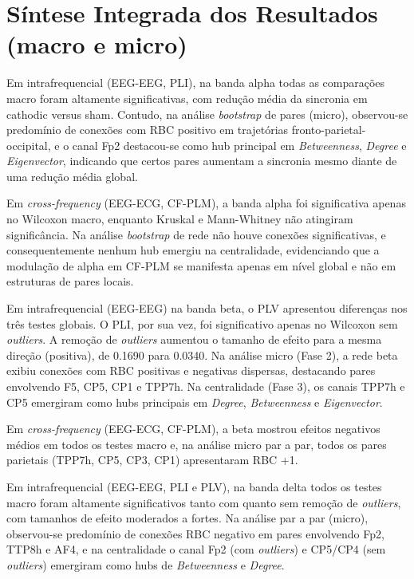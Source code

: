 \section{Síntese Integrada dos Resultados (macro e micro)}
Em intrafrequencial (EEG-EEG, PLI), na banda alpha todas as comparações macro foram altamente significativas, com redução média da sincronia em cathodic versus sham. Contudo, na análise \textit{bootstrap} de pares (micro), observou-se predomínio de conexões com RBC positivo em trajetórias fronto-parietal-occipital, e o canal Fp2 destacou-se como hub principal em \textit{Betweenness}, \textit{Degree} e \textit{Eigenvector}, indicando que certos pares aumentam a sincronia mesmo diante de uma redução média global.

Em \textit{cross-frequency} (EEG-ECG, CF-PLM), a banda alpha foi significativa apenas no Wilcoxon macro, enquanto Kruskal e Mann-Whitney não atingiram significância. Na análise \textit{bootstrap} de rede não houve conexões significativas, e consequentemente nenhum hub emergiu na centralidade, evidenciando que a modulação de alpha em CF-PLM se manifesta apenas em nível global e não em estruturas de pares locais.

Em intrafrequencial (EEG-EEG) na banda beta, o PLV apresentou diferenças nos três testes globais. O PLI, por sua vez, foi significativo apenas no Wilcoxon sem \textit{outliers}. A remoção de \textit{outliers} aumentou o tamanho de efeito para a mesma direção (positiva), de 0.1690 para 0.0340. Na análise micro (Fase 2), a rede beta exibiu conexões com RBC positivas e negativas dispersas, destacando pares envolvendo F5, CP5, CP1 e TPP7h. Na centralidade (Fase 3), os canais TPP7h e CP5 emergiram como hubs principais em \textit{Degree}, \textit{Betweenness} e \textit{Eigenvector}. 

Em \textit{cross-frequency} (EEG-ECG, CF-PLM), a beta mostrou efeitos negativos médios em todos os testes macro e, na análise micro par a par, todos os pares parietais (TPP7h, CP5, CP3, CP1) apresentaram RBC +1.

Em intrafrequencial (EEG-EEG, PLI e PLV), na banda delta todos os testes macro foram altamente significativos tanto com quanto sem remoção de \textit{outliers}, com tamanhos de efeito moderados a fortes. Na análise par a par (micro), observou-se predomínio de conexões RBC negativo em pares envolvendo Fp2, TTP8h e AF4, e na centralidade o canal Fp2 (com \textit{outliers}) e CP5/CP4 (sem \textit{outliers}) emergiram como hubs de \textit{Betweenness} e \textit{Degree}.

